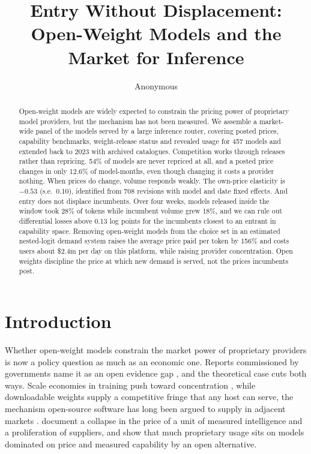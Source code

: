 \documentclass{article}
\title{Entry Without Displacement:\\Open-Weight Models and the Market for Inference}
\author{Anonymous}
\newcommand{\Nactive}{457}
\newcommand{\NeverRepriced}{54}
\newcommand{\MonthlyFreq}{12.6}
\newcommand{\NRevisions}{708}
\newcommand{\ElastTok}{$-0.53$}
\newcommand{\ElastTokSE}{0.10}
\newcommand{\EntrantShare}{28}
\newcommand{\IncumbentGrowth}{18}
\newcommand{\DiversionMDE}{0.13}
\newcommand{\CFprice}{156}
\newcommand{\CFdollars}{2.4}
\begin{document}
\maketitle

\begin{abstract}
Open-weight models are widely expected to constrain the pricing power of proprietary model
providers, but the mechanism has not been measured. We assemble a market-wide panel of the
models served by a large inference router, covering posted prices, capability benchmarks,
weight-release status and revealed usage for \Nactive{} models and extended back to 2023 with
archived catalogues. Competition works through releases rather than repricing.
\NeverRepriced\% of models are never repriced at all, and a posted price changes in only
\MonthlyFreq\% of model-months, even though changing it costs a provider nothing. When prices do change, volume responds weakly. The own-price
elasticity is \ElastTok{} (s.e.\ \ElastTokSE), identified from \NRevisions{} revisions
with model and date fixed effects. And entry does not displace incumbents. Over four weeks,
models released inside the window took \EntrantShare\% of tokens while incumbent volume
grew \IncumbentGrowth\%, and we can rule out differential losses above \DiversionMDE{}
log points for the incumbents closest to an entrant in capability space. Removing open-weight models from the choice set in an
estimated nested-logit demand system raises the average price paid per token by
\CFprice\% and costs users about \$\CFdollars{}m per day on this platform, while raising
provider concentration. Open weights discipline the price at which new demand is served,
not the prices incumbents post.
\end{abstract}

\section{Introduction}

Whether open-weight models constrain the market power of proprietary providers is now a
policy question as much as an economic one. Reports commissioned by governments name it as
an open evidence gap \citep{bengio2026}, and the theoretical case cuts both ways. Scale
economies in training push toward concentration \citep{kaplan2020,korinek2025}, while
downloadable weights supply a competitive fringe that any host can serve, the mechanism
open-source software has long been argued to supply in adjacent markets
\citep{lerner2002,nagle2019}. \citet{demirer2025} document a collapse in the price of a
unit of measured intelligence and a proliferation of suppliers, and \citet{nagle2025} show
that much proprietary usage sits on models dominated on price and measured capability by an
open alternative.
\end{document}
